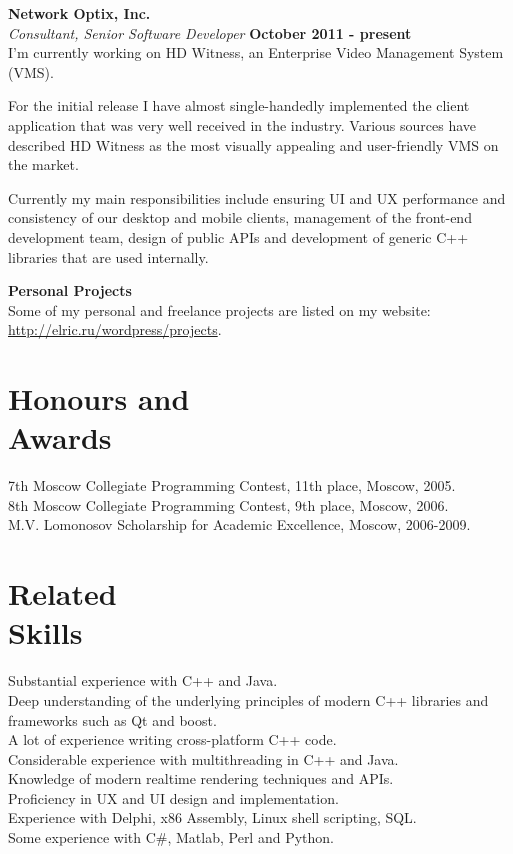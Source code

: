 \documentclass[margin,line]{CV}
\begin{document}
\begin{resume}
    \textbf{Network Optix, Inc.} \vspace{2mm}\\\vspace{1mm}%
    \textsl{Consultant, Senior Software Developer} \hfill \textbf{October 2011 - present}\\
    I'm currently working on HD Witness, an Enterprise Video Management System (VMS). 
    
    For the initial release I have almost single-handedly implemented the client application that was very well received in the industry. Various sources have described HD Witness as the most visually appealing and user-friendly VMS on the market. 
    
    Currently my main responsibilities include ensuring UI and UX performance and consistency of our desktop and mobile clients, management of the front-end development team, design of public APIs and development of generic C++ libraries that are used internally.
    
	\textbf{Personal Projects} \vspace{2mm}\\\vspace{1mm}%
	Some of my personal and freelance projects are listed on my website: \url{http://elric.ru/wordpress/projects}.

    \pagebreak
    
    \section{\mysidestyle Honours and\\Awards}
    7th Moscow Collegiate Programming Contest, 11th place, Moscow, 2005.                            \vspace{1mm}\\%
    8th Moscow Collegiate Programming Contest, 9th place, Moscow, 2006.                             \vspace{1mm}\\%
    M.V. Lomonosov Scholarship for Academic Excellence, Moscow, 2006-2009.


    \section{\mysidestyle Related\\Skills}
    Substantial experience with C++ and Java. \\
	Deep understanding of the underlying principles of modern C++ libraries and frameworks such as Qt and boost. \\
    A lot of experience writing cross-platform C++ code. \\
    Considerable experience with multithreading in C++ and Java. \\
    Knowledge of modern realtime rendering techniques and APIs. \\
    Proficiency in UX and UI design and implementation. \\
    Experience with Delphi, x86 Assembly, Linux shell scripting, SQL. \\
    Some experience with C\#, Matlab, Perl and Python. \\



\end{resume}
\end{document}
